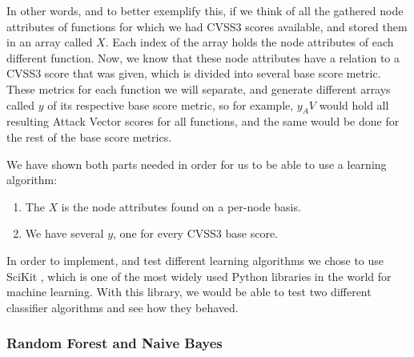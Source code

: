 In other words, and to better exemplify this, if we think of all the gathered node attributes of functions for which we had CVSS3 scores available, and stored them in an array called $X$. Each index of the array holds the node attributes of each different function. Now, we know that these node attributes have a relation to a CVSS3 score that was given, which is divided into several base score metric. These metrics for each function we will separate, and generate different arrays called $y$ of its respective base score metric, so for example, $y_AV$ would hold all resulting Attack Vector scores for all functions, and the same would be done for the rest of the base score metrics.

We have shown both parts needed in order for us to be able to use a learning algorithm:

\begin{enumerate}
	\item The $X$ is the node attributes found on a per-node basis.
	\item We have several $y$, one for every CVSS3 base score. 
\end{enumerate}

In order to implement, and test different learning algorithms we chose to use SciKit \parencite{scikit}, which is one of the most widely used Python libraries in the world for machine learning. With this library, we would be able to test two different classifier algorithms and see how they behaved.

\subsubsection{Random Forest and Naive Bayes}

